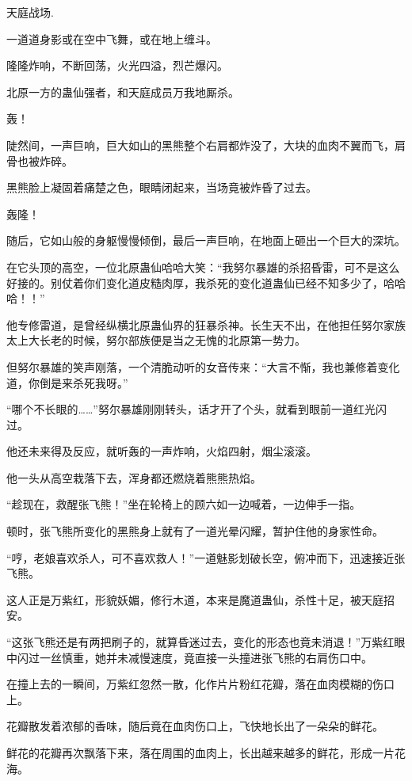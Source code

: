 
\begin{this_body}

天庭战场.

一道道身影或在空中飞舞，或在地上缠斗。

隆隆炸响，不断回荡，火光四溢，烈芒爆闪。

北原一方的蛊仙强者，和天庭成员万我地厮杀。

轰！

陡然间，一声巨响，巨大如山的黑熊整个右肩都炸没了，大块的血肉不翼而飞，肩骨也被炸碎。

黑熊脸上凝固着痛楚之色，眼睛闭起来，当场竟被炸昏了过去。

轰隆！

随后，它如山般的身躯慢慢倾倒，最后一声巨响，在地面上砸出一个巨大的深坑。

在它头顶的高空，一位北原蛊仙哈哈大笑：“我努尔暴雄的杀招昏雷，可不是这么好接的。别仗着你们变化道皮糙肉厚，我杀死的变化道蛊仙已经不知多少了，哈哈哈！！”

他专修雷道，是曾经纵横北原蛊仙界的狂暴杀神。长生天不出，在他担任努尔家族太上大长老的时候，努尔部族便是当之无愧的北原第一势力。

但努尔暴雄的笑声刚落，一个清脆动听的女音传来：“大言不惭，我也兼修着变化道，你倒是来杀死我呀。”

“哪个不长眼的……”努尔暴雄刚刚转头，话才开了个头，就看到眼前一道红光闪过。

他还未来得及反应，就听轰的一声炸响，火焰四射，烟尘滚滚。

他一头从高空栽落下去，浑身都还燃烧着熊熊热焰。

“趁现在，救醒张飞熊！”坐在轮椅上的顾六如一边喊着，一边伸手一指。

顿时，张飞熊所变化的黑熊身上就有了一道光晕闪耀，暂护住他的身家性命。

“哼，老娘喜欢杀人，可不喜欢救人！”一道魅影划破长空，俯冲而下，迅速接近张飞熊。

这人正是万紫红，形貌妖媚，修行木道，本来是魔道蛊仙，杀性十足，被天庭招安。

“这张飞熊还是有两把刷子的，就算昏迷过去，变化的形态也竟未消退！”万紫红眼中闪过一丝慎重，她并未减慢速度，竟直接一头撞进张飞熊的右肩伤口中。

在撞上去的一瞬间，万紫红忽然一散，化作片片粉红花瓣，落在血肉模糊的伤口上。

花瓣散发着浓郁的香味，随后竟在血肉伤口上，飞快地长出了一朵朵的鲜花。

鲜花的花瓣再次飘落下来，落在周围的血肉上，长出越来越多的鲜花，形成一片花海。


\end{this_body}
